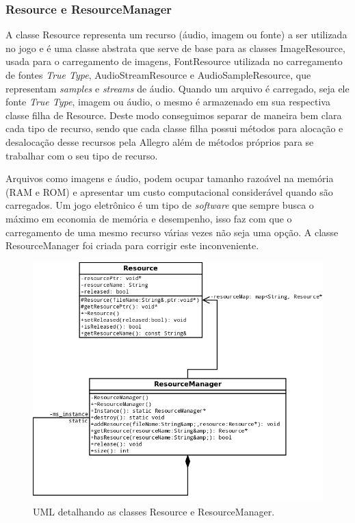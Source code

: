 \subsubsection{Resource e ResourceManager}
%
A classe Resource representa um recurso (áudio, imagem ou fonte) a ser utilizada no jogo e é uma classe abstrata que serve de base para as classes ImageResource, usada para o carregamento de imagens, FontResource utilizada no carregamento de fontes \textit{True Type}, AudioStreamResource e AudioSampleResource, que representam \textit{samples} e \textit{streams} de áudio. Quando um arquivo é carregado, seja ele fonte \textit{True Type}, imagem ou áudio, o mesmo é armazenado em sua respectiva classe filha de Resource. Deste modo conseguimos separar de maneira bem clara cada tipo de recurso, sendo que cada classe filha possui métodos para alocação e desalocação desse recursos pela Allegro além de métodos próprios para se trabalhar com o seu tipo de recurso. 
%
\par
Arquivos como imagens e áudio, podem ocupar tamanho razoável na memória (RAM e ROM) e apresentar um custo computacional considerável quando são carregados. Um jogo eletrônico é um tipo de \textit{software} que sempre busca o máximo em economia de memória e desempenho, isso faz com que o carregamento de uma mesmo recurso várias vezes não seja uma opção. A classe ResourceManager foi criada para corrigir este inconveniente.
%
%
\begin{figure}[h]
    \centering
    \includegraphics[scale = 0.4]{uml/ResourceManager.png}
    \caption{UML detalhando as classes Resource e ResourceManager.}
    \label{ResourceManager}
\end{figure}
